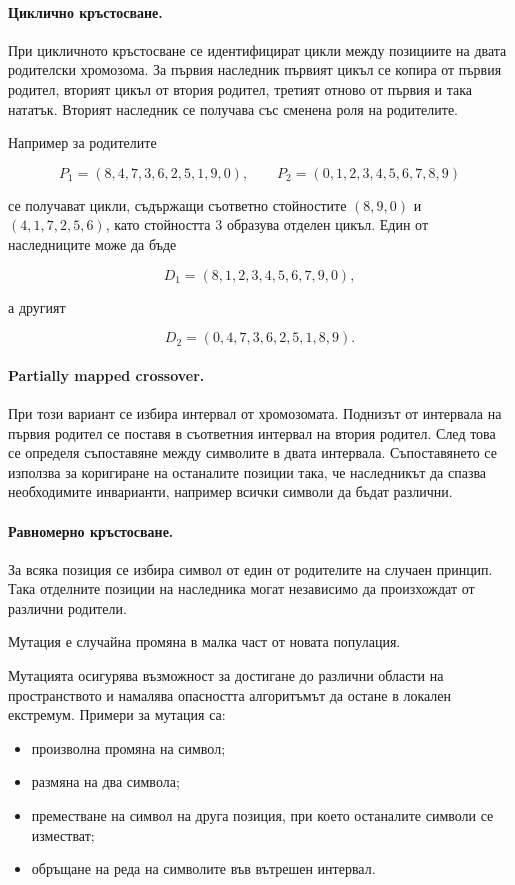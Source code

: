 \paragraph{Циклично кръстосване.}
При цикличното кръстосване се идентифицират цикли между позициите на двата родителски хромозома. За първия наследник първият цикъл се копира от първия родител, вторият цикъл от втория родител, третият отново от първия и така нататък. Вторият наследник се получава със сменена роля на родителите.

Например за родителите

\[
P_1=(8,4,7,3,6,2,5,1,9,0),
\qquad
P_2=(0,1,2,3,4,5,6,7,8,9)
\]

се получават цикли, съдържащи съответно стойностите $(8,9,0)$ и $(4,1,7,2,5,6)$, като стойността $3$ образува отделен цикъл. Един от наследниците може да бъде

\[
D_1=(8,1,2,3,4,5,6,7,9,0),
\]

а другият

\[
D_2=(0,4,7,3,6,2,5,1,8,9).
\]

\paragraph{Partially mapped crossover.}
При този вариант се избира интервал от хромозомата. Поднизът от интервала на първия родител се поставя в съответния интервал на втория родител. След това се определя съпоставяне между символите в двата интервала. Съпоставянето се използва за коригиране на останалите позиции така, че наследникът да спазва необходимите инварианти, например всички символи да бъдат различни.

\paragraph{Равномерно кръстосване.}
За всяка позиция се избира символ от един от родителите на случаен принцип. Така отделните позиции на наследника могат независимо да произхождат от различни родители.

\begin{defn}[Мутация]
Мутация е случайна промяна в малка част от новата популация.
\end{defn}

Мутацията осигурява възможност за достигане до различни области на пространството и намалява опасността алгоритъмът да остане в локален екстремум. Примери за мутация са:

\begin{itemize}
\item произволна промяна на символ;
\item размяна на два символа;
\item преместване на символ на друга позиция, при което останалите символи се изместват;
\item обръщане на реда на символите във вътрешен интервал.
\end{itemize}

